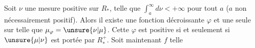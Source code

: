 Soit \(\nu\) une mesure positive sur \(R_*\), telle que \(\int_a^\infty d\nu<+\infty\) pour tout \(a\) (\(a\) non nécessairement positif).  Alors il existe une fonction décroissante \(\varphi\) et une seule sur \inserted{\(R_*^+\) (resp. \deleted{\(\unsure{]0,M[}\)} sur \(]0,M[\))} telle que \(\mu_\varphi=\unsure{\nu|\mu}\). Cette \(\varphi\) est positive si et seulement si \(\unsure{\mu|\nu}\) est portée par \(R_*^+\).  Soit maintenant \(f\) telle


